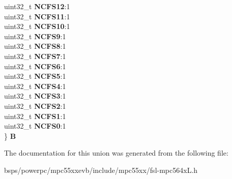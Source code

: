 \begin{DoxyCompactItemize}
\begin{tabbing}
\>uint32\_t {\bfseries NCFS12}:1\\
\>uint32\_t {\bfseries NCFS11}:1\\
\>uint32\_t {\bfseries NCFS10}:1\\
\>uint32\_t {\bfseries NCFS9}:1\\
\>uint32\_t {\bfseries NCFS8}:1\\
\>uint32\_t {\bfseries NCFS7}:1\\
\>uint32\_t {\bfseries NCFS6}:1\\
\>uint32\_t {\bfseries NCFS5}:1\\
\>uint32\_t {\bfseries NCFS4}:1\\
\>uint32\_t {\bfseries NCFS3}:1\\
\>uint32\_t {\bfseries NCFS2}:1\\
\>uint32\_t {\bfseries NCFS1}:1\\
\>uint32\_t {\bfseries NCFS0}:1\\
\} {\bfseries B}\\

\end{tabbing}\end{DoxyCompactItemize}


The documentation for this union was generated from the following file\+:\begin{DoxyCompactItemize}
\item 
bsps/powerpc/mpc55xxevb/include/mpc55xx/fsl-\/mpc564x\+L.\+h\end{DoxyCompactItemize}
